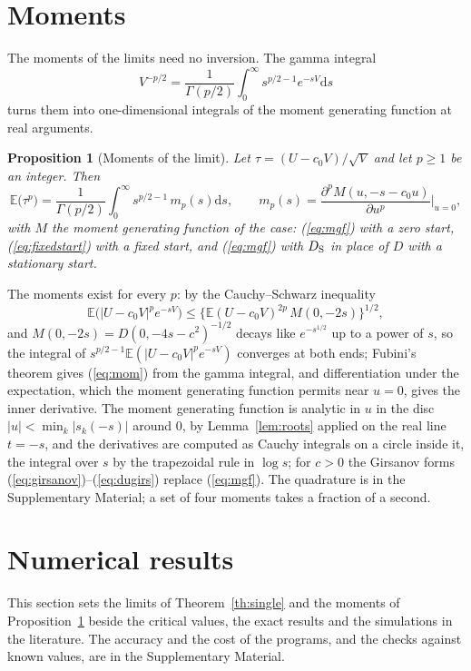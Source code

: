 \documentclass[ecta,nameyear,final]{econsocart}
\newcommand{\E}{{\mathbb E}}
\newcommand{\dr}[1]{{\mathrm d}#1}
\theoremstyle{plain}
\newtheorem{proposition}{Proposition}
\theoremstyle{definition}
\begin{document}
\section{Moments}
\label{sec:mom}

The moments of the limits need no inversion.  The gamma integral
\[
V^{-p/2}=\frac{1}{\Gamma(p/2)}\int_0^\infty s^{p/2-1}e^{-sV}\dr{s}
\]
turns them into one-dimensional integrals of the moment generating function at real arguments.

\begin{proposition}[Moments of the limit]
\label{prop:mom}
Let $\tau=(U-c_0V)/\sqrt V$ and let $p\ge1$ be an integer.  Then
\begin{equation}
\E\big(\tau^p\big)=\frac{1}{\Gamma(p/2)}\int_0^\infty s^{p/2-1}\,m_p(s)\dr{s},\qquad
m_p(s)=\frac{\partial^pM(u,-s-c_0u)}{\partial u^p}\Big|_{u=0},
\label{eq:mom}
\end{equation}
with $M$ the moment generating function of the case: (\ref{eq:mgf}) with a zero start, (\ref{eq:fixedstart}) with a fixed start, and (\ref{eq:mgf}) with $D_{\rm S}$ in place of $D$ with a stationary start.
\end{proposition}

The moments exist for every $p$: by the Cauchy--Schwarz inequality
\[
\E\big(|U-c_0V|^pe^{-sV}\big)\le\big\{\E(U-c_0V)^{2p}\,M(0,-2s)\big\}^{1/2},
\]
and $M(0,-2s)=D(0,-4s-c^2)^{-1/2}$ decays like $e^{-s^{1/2}}$ up to a power of $s$, so the integral of $s^{p/2-1}\E(|U-c_0V|^pe^{-sV})$ converges at both ends; Fubini's theorem gives (\ref{eq:mom}) from the gamma integral, and differentiation under the expectation, which the moment generating function permits near $u=0$, gives the inner derivative.  The moment generating function is analytic in $u$ in the disc $|u|<\min_k|s_k(-s)|$ around $0$, by Lemma~\ref{lem:roots} applied on the real line $t=-s$, and the derivatives are computed as Cauchy integrals on a circle inside it, the integral over $s$ by the trapezoidal rule in $\log s$; for $c>0$ the Girsanov forms (\ref{eq:girsanov})--(\ref{eq:dugirs}) replace (\ref{eq:mgf}).  The quadrature is in the Supplementary Material; a set of four moments takes a fraction of a second.

\section{Numerical results}
\label{sec:results}

This section sets the limits of Theorem~\ref{th:single} and the moments of Proposition~\ref{prop:mom} beside the critical values, the exact results and the simulations in the literature.  The accuracy and the cost of the programs, and the checks against known values, are in the Supplementary Material.
\end{document}
